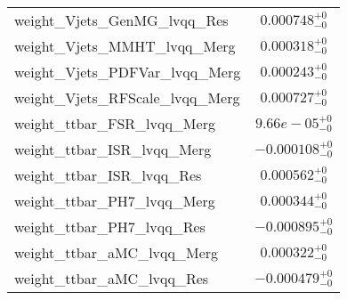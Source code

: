 \begin{tabular}{|l|c|}
weight\_Vjets\_GenMG\_lvqq\_Res & $0.000748^{+0}_{-0}$ \\
weight\_Vjets\_MMHT\_lvqq\_Merg & $0.000318^{+0}_{-0}$ \\
weight\_Vjets\_PDFVar\_lvqq\_Merg & $0.000243^{+0}_{-0}$ \\
weight\_Vjets\_RFScale\_lvqq\_Merg & $0.000727^{+0}_{-0}$ \\
weight\_ttbar\_FSR\_lvqq\_Merg & $9.66e-05^{+0}_{-0}$ \\
weight\_ttbar\_ISR\_lvqq\_Merg & $-0.000108^{+0}_{-0}$ \\
weight\_ttbar\_ISR\_lvqq\_Res & $0.000562^{+0}_{-0}$ \\
weight\_ttbar\_PH7\_lvqq\_Merg & $0.000344^{+0}_{-0}$ \\
weight\_ttbar\_PH7\_lvqq\_Res & $-0.000895^{+0}_{-0}$ \\
weight\_ttbar\_aMC\_lvqq\_Merg & $0.000322^{+0}_{-0}$ \\
weight\_ttbar\_aMC\_lvqq\_Res & $-0.000479^{+0}_{-0}$ \\
\hline
\end{tabular}
